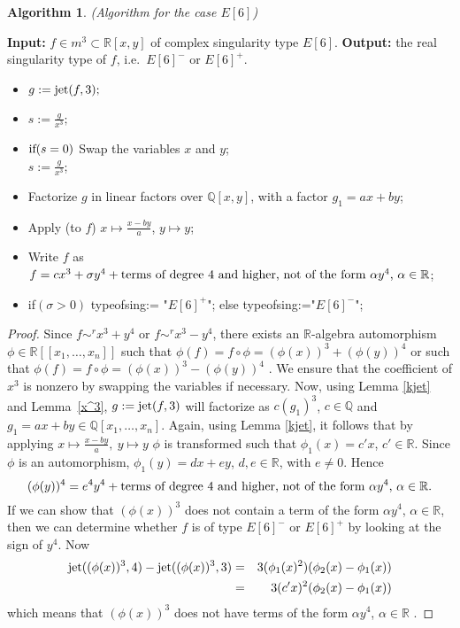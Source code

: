 \documentclass{amsproc}
\begin{document}
\newtheorem{E[6]}[kjet]{Algorithm}
\begin{E[6]}(Algorithm for the case $E[6]$)
\end{E[6]}
\noindent\textnormal{\bf Input:} $f\in m^3\subset\mathbb R[x,y]$ of complex singularity type $E[6]$.\newline
\textnormal{\bf Output:} the real singularity type of $f$, i.e.~$E[6]^-$ or $E[6]^+$.
\begin{itemize}
\item $g:= \textnormal{jet}(f,3);$
\item $s:= \frac{g}{x^3};$
\item $\textnormal{if}(s=0)$\newline
\phantom{}\quad Swap the variables $x$ and $y$;\\
\phantom{}\quad $s:=\frac{g}{x^3}$;
\item Factorize $g$ in linear factors over $\mathbb Q[x,y]$, with a factor $g_1=ax+by$;
\item Apply (to $f$) $x\mapsto \frac{x-by}{a}$, $y\mapsto y$;
\item Write $f$ as $f=cx^3+\sigma y^4+\textnormal{terms of degree $4$ and higher, not of the form $\alpha y^4$, $\alpha\in\mathbb R$}$;
\item \textnormal{if}$(\sigma>0)$\newline
\phantom{}\quad typeofsing:= "$E[6]^+$";\newline
\phantom{} else\newline
\phantom{}\quad typeofsing:="$E[6]^-$";
\end{itemize}
\begin{proof}
Since $f\sim^r x^3+y^4$ or $f\sim^rx^3-y^4$, there exists an $\mathbb R$-algebra automorphism $\phi\in\mathbb R[[x_1,\ldots,x_n]]$ such that $\phi(f)=f\circ\phi=(\phi(x))^3+(\phi(y))^4$ or such that $\phi(f)=f\circ\phi=(\phi(x))^3-(\phi(y))^4$ . We ensure that the coefficient of $x^3$ is nonzero by swapping the variables if necessary. Now, using Lemma \ref{kjet} and Lemma~\ref{x^3}, $g:=\textnormal{jet}(f,3)$ will factorize as $c(g_1)^3$, $c\in\mathbb Q$ and $g_1=ax+by\in\mathbb Q[x_1,\ldots,x_n]$. Again, using Lemma \ref{kjet}, it follows that by applying $x\mapsto\frac{x-by}{a},\ y\mapsto y$ $\phi$ is transformed such that $\phi_1(x)=c'x$, $c'\in\mathbb R$. Since $\phi$ is an automorphism, $\phi_1(y)=dx+ey$, $d,e\in\mathbb R$, with $e\neq 0$. Hence
\begin{equation*}
(\phi(y))^4=e^4y^4+\textnormal{terms of degree 4 and higher, not of the form $\alpha y^4$, $\alpha\in\mathbb R$.}
\end{equation*}
If we can show that $(\phi(x))^3$ does not contain a term of the form $\alpha y^4$, $\alpha\in\mathbb R$, then we can determine whether $f$ is of type $E[6]^-$ or $E[6]^+$ by looking at the sign of $y^4$. Now 
\begin{eqnarray*}
\textnormal{jet}((\phi(x))^3,4)-\textnormal{jet}((\phi(x))^3,3)&=&3(\phi_1(x)^2)(\phi_2(x)-\phi_1(x))\\&=&3(c'x)^2(\phi_2(x)-\phi_1(x))
\end{eqnarray*}
 which means that $(\phi(x))^3$ does not have terms of the form $\alpha y^4$, $\alpha\in\mathbb R$ .   
\end{proof}
\end{document}
